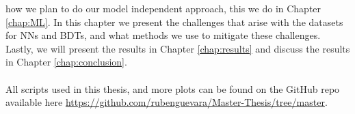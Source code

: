 \documentclass[12pt, a4paper]{book}
\begin{document}
how we plan to do our model independent approach, this we do in Chapter \ref{chap:ML}. In this chapter we present the challenges that arise with the datasets for NNs and BDTs, and what methods we use to mitigate these challenges. Lastly, we will present the results in Chapter \ref{chap:results} 
and discuss the results in Chapter \ref{chap:conclusion}.\\
\\All scripts used in this thesis, and more plots can be found on the GitHub repo available here \href{https://github.com/rubenguevara/Master-Thesis/tree/master}{https://github.com/rubenguevara/Master-Thesis/tree/master}.
\end{document}
